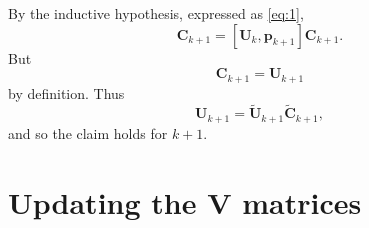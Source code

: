 \documentclass[11pt,a4paper]{article}
\newcommand{\0}{\M{0}}
\newcommand{\M}[1]{\mathbf{#1}}
\newcommand{\Mt}[1]{\tilde{\M{#1}}}
\newcommand{\ve}[1]{\mathbf{#1}}
\begin{document}
By the inductive hypothesis, expressed as \eqref{eq:1}, 
\begin{displaymath}
  [\Mt{U}_k  \Mt{C}_k, \ve{p}_{k+1}] \M{C}_{k+1}
  =
  [\M{U}_k, \ve{p}_{k+1}] \M{C}_{k+1}.
\end{displaymath}
But
\begin{displaymath}
  [\M{U}_k, \ve{p}_{k+1}] \M{C}_{k+1}
  =
  \M{U}_{k+1}
\end{displaymath}
by definition.  Thus
\begin{displaymath}
  \label{eq:1}
  \M{U}_{k+1} = \Mt{U}_{k+1} \Mt{C}_{k+1},
\end{displaymath}
and so the claim holds for $k+1$.

\section{Updating the $\M{V}$ matrices}
\end{document}
